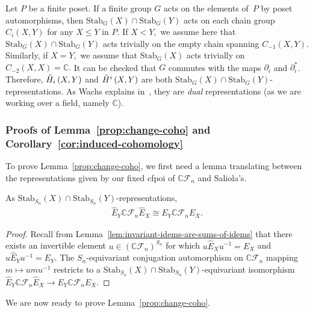 \documentclass[ALCO, Unicode]{cedram}
\def\C{{\mathbb{C}}}
\def\stab{\mathrm{Stab}}
\begin{document}
\begin{rema} \label{rem:group-poset}
    Let $P$ be a finite poset. If a finite group $G$ acts on the elements of~$P$ by poset automorphisms, then $\stab_G(X) \cap \stab_G(Y)$ acts on each chain group $C_i(X, Y)$ for any $X \leq Y$ in $P.$ If $X < Y,$ we assume here that $\stab_G(X) \cap \stab_G(Y)$ acts trivially on the empty chain spanning $C_{-1}(X, Y).$ Similarly, if $X = Y,$ we assume that $\stab_G(X)$ acts trivially on $C_{-2}(X, X) = \C.$ It can be checked that $G$ commutes with the maps $\partial_i$ and $\partial_i^\ast$. Therefore,  $\Tilde{H}_i\left(X, Y\right)$ and $\Tilde{H}^i\left(X, Y\right)$ are both $\stab_G(X) \cap \stab_G(Y)$-representations.  As Wachs explains in~\cite[p31]{WachsPosetTopology}, they are \textit{dual} representations (as we are working over a field, namely $\C$).
\end{rema}

\subsubsection{Proofs of Lemma~\ref{prop:change-coho} and Corollary~\ref{cor:induced-cohomology}}\label{sec:precise-conversion}
To prove Lemma~\ref{prop:change-coho}, we first need a lemma translating between the representations given by our fixed cfpoi of $\C \mathcal{F}_n$ and Saliola's.
\begin{lemma}\label{lem:saliolas-idems-to-ours-for-hom}
    As $\stab_{S_n}(X)\cap \stab_{S_n}(Y)$-representations, 
    \begin{align*}
        \widehat{E}_Y \C \mathcal{F}_n \widehat{E}_X \cong  E_Y \C \mathcal{F}_n E_X.
    \end{align*}
\end{lemma}

\begin{proof}
   Recall from Lemma~\ref{lem:invariant-idems-are-sums-of-idems} that there exists an invertible element $u \in \left(\C \mathcal{F}_n \right)^{S_n}$ for which $u\widehat{E}_Xu^{-1} = E_X$ and $u\widehat{E}_Yu^{-1} = E_Y.$ The $S_n$-equivariant conjugation automorphism on $\C \mathcal{F}_n$ mapping $m \mapsto umu^{-1}$ restricts to a $\stab_{S_n}(X) \cap \stab_{S_n}(Y)$-equivariant isomorphism $\widehat{E}_Y \C \mathcal{F}_n \widehat{E}_X \to E_Y \C \mathcal{F}_n E_X.$
\end{proof}

We are now ready to prove Lemma~\ref{prop:change-coho}.
\end{document}
